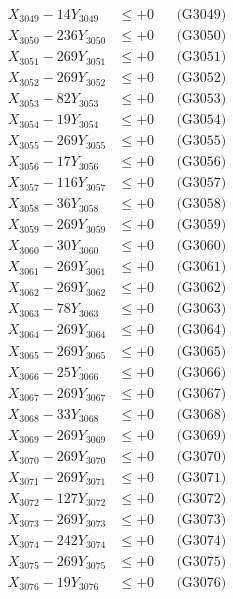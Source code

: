 \documentclass[a4paper,10pt]{article}
\begin{document}
{\begin{align}
X_{3049} - 14Y_{3049} &\leq +0 && \text{(G3049)} \\
X_{3050} - 236Y_{3050} &\leq +0 && \text{(G3050)} \\
\allowbreak
X_{3051} - 269Y_{3051} &\leq +0 && \text{(G3051)} \\
X_{3052} - 269Y_{3052} &\leq +0 && \text{(G3052)} \\
X_{3053} - 82Y_{3053} &\leq +0 && \text{(G3053)} \\
X_{3054} - 19Y_{3054} &\leq +0 && \text{(G3054)} \\
X_{3055} - 269Y_{3055} &\leq +0 && \text{(G3055)} \\
X_{3056} - 17Y_{3056} &\leq +0 && \text{(G3056)} \\
X_{3057} - 116Y_{3057} &\leq +0 && \text{(G3057)} \\
X_{3058} - 36Y_{3058} &\leq +0 && \text{(G3058)} \\
X_{3059} - 269Y_{3059} &\leq +0 && \text{(G3059)} \\
X_{3060} - 30Y_{3060} &\leq +0 && \text{(G3060)} \\
\allowbreak
X_{3061} - 269Y_{3061} &\leq +0 && \text{(G3061)} \\
X_{3062} - 269Y_{3062} &\leq +0 && \text{(G3062)} \\
X_{3063} - 78Y_{3063} &\leq +0 && \text{(G3063)} \\
X_{3064} - 269Y_{3064} &\leq +0 && \text{(G3064)} \\
X_{3065} - 269Y_{3065} &\leq +0 && \text{(G3065)} \\
X_{3066} - 25Y_{3066} &\leq +0 && \text{(G3066)} \\
X_{3067} - 269Y_{3067} &\leq +0 && \text{(G3067)} \\
X_{3068} - 33Y_{3068} &\leq +0 && \text{(G3068)} \\
X_{3069} - 269Y_{3069} &\leq +0 && \text{(G3069)} \\
X_{3070} - 269Y_{3070} &\leq +0 && \text{(G3070)} \\
\allowbreak
X_{3071} - 269Y_{3071} &\leq +0 && \text{(G3071)} \\
X_{3072} - 127Y_{3072} &\leq +0 && \text{(G3072)} \\
X_{3073} - 269Y_{3073} &\leq +0 && \text{(G3073)} \\
X_{3074} - 242Y_{3074} &\leq +0 && \text{(G3074)} \\
X_{3075} - 269Y_{3075} &\leq +0 && \text{(G3075)} \\
X_{3076} - 19Y_{3076} &\leq +0 && \text{(G3076)} \\

\end{align}}
\end{document}
